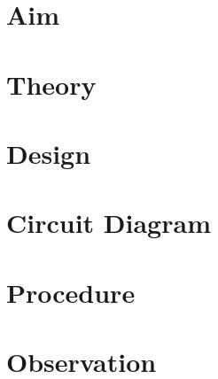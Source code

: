 \documentclass{book}
\begin{document}
\section*{Aim}
\section*{Theory}
\section*{Design}
\section*{Circuit Diagram}
\section*{Procedure}
\section*{Observation}
\end{document}
